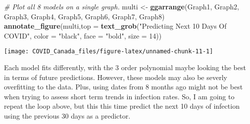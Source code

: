\documentclass[]{tufte-handout}
\newenvironment{Shaded}{}{}
\newcommand{\CommentTok}[1]{\textcolor[rgb]{0.38,0.63,0.69}{\textit{#1}}}
\newcommand{\DataTypeTok}[1]{\textcolor[rgb]{0.56,0.13,0.00}{#1}}
\newcommand{\DecValTok}[1]{\textcolor[rgb]{0.25,0.63,0.44}{#1}}
\newcommand{\KeywordTok}[1]{\textcolor[rgb]{0.00,0.44,0.13}{\textbf{#1}}}
\newcommand{\NormalTok}[1]{#1}
\newcommand{\StringTok}[1]{\textcolor[rgb]{0.25,0.44,0.63}{#1}}
\begin{document}
\begin{Shaded}
\begin{Highlighting}[]
\CommentTok{# Plot all 8 models on a single graph.}
\NormalTok{multi <-}\StringTok{ }\KeywordTok{ggarrange}\NormalTok{(Graph1, Graph2, Graph3, Graph4, Graph5, Graph6, Graph7, Graph8)}
\KeywordTok{annotate_figure}\NormalTok{(multi,}\DataTypeTok{top =} \KeywordTok{text_grob}\NormalTok{(}\StringTok{"Predicting Next 10 Days Of COVID"}\NormalTok{, }\DataTypeTok{color =} \StringTok{"black"}\NormalTok{, }\DataTypeTok{face =} \StringTok{"bold"}\NormalTok{, }\DataTypeTok{size =} \DecValTok{14}\NormalTok{))}
\end{Highlighting}
\end{Shaded}

\texttt{[image: COVID\_Canada\_files/figure-latex/unnamed-chunk-11-1]}

Each model fits differently, with the 3 order polynomial maybe looking
the best in terms of future predictions. However, these models may also
be severly overfitting to the data. Plus, using dates from 8 months ago
might not be best when trying to assess short term trends in infection
rates. So, I am going to repeat the loop above, but this this time
predict the next 10 days of infection using the previous 30 days as a
predictor.
\end{document}
